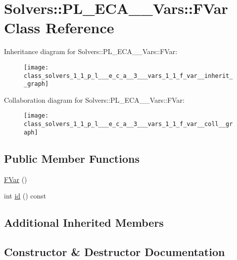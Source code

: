 \hypertarget{class_solvers_1_1_p_l___e_c_a__3___vars_1_1_f_var}{}\section{Solvers\+:\+:P\+L\+\_\+\+E\+C\+A\+\_\+\_\+\+Vars\+:\+:F\+Var Class Reference}
\label{class_solvers_1_1_p_l___e_c_a__3___vars_1_1_f_var}


Inheritance diagram for Solvers\+:\+:P\+L\+\_\+\+E\+C\+A\+\_\+\_\+\+Vars\+:\+:F\+Var\+:\nopagebreak
\begin{figure}[H]
\begin{center}
\leavevmode
\texttt{[image: class\_solvers\_1\_1\_p\_l\_\_\_e\_c\_a\_\_3\_\_\_vars\_1\_1\_f\_var\_\_inherit\_\_graph]}
\end{center}
\end{figure}


Collaboration diagram for Solvers\+:\+:P\+L\+\_\+\+E\+C\+A\+\_\+\_\+\+Vars\+:\+:F\+Var\+:\nopagebreak
\begin{figure}[H]
\begin{center}
\leavevmode
\texttt{[image: class\_solvers\_1\_1\_p\_l\_\_\_e\_c\_a\_\_3\_\_\_vars\_1\_1\_f\_var\_\_coll\_\_graph]}
\end{center}
\end{figure}
\subsection*{Public Member Functions}
\begin{DoxyCompactItemize}
\item 
\hyperlink{class_solvers_1_1_p_l___e_c_a__3___vars_1_1_f_var_af913d0630b68754b3f19e84ec022fa6e}{F\+Var} ()
\item 
int \hyperlink{class_solvers_1_1_p_l___e_c_a__3___vars_1_1_f_var_a4f84286d12212ae32eb4c8fde3f8916f}{id} () const
\end{DoxyCompactItemize}
\subsection*{Additional Inherited Members}


\subsection{Constructor \& Destructor Documentation}
\mbox{\label{class_solvers_1_1_p_l___e_c_a__3___vars_1_1_f_var_af913d0630b68754b3f19e84ec022fa6e}} 
